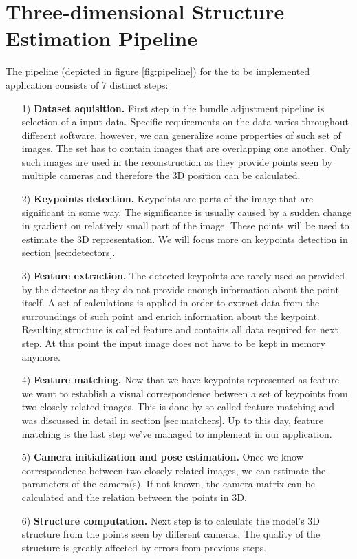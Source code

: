 \section{Three-dimensional Structure Estimation Pipeline}
The pipeline (depicted in figure \ref{fig:pipeline}) for the to be implemented application consists of 7 distinct steps:
\begin{itemize}
	\item[1)] \textbf{Dataset aquisition.} First step in the bundle adjustment pipeline is selection of a input data. Specific requirements on the data varies throughout different software, however, we can generalize some properties of such set of images. The set has to contain images that are overlapping one another. Only such images are used in the reconstruction as they provide points seen by multiple cameras and therefore the 3D position can be calculated.
	\item[2)] \textbf{Keypoints detection.} Keypoints are parts of the image that are significant in some way. The significance is usually caused by a sudden change in gradient on relatively small part of the image. These points will be used to estimate the 3D representation. We will focus more on keypoints detection in section \ref{sec:detectors}. 
	\item[3)] \textbf{Feature extraction.} The detected keypoints are rarely used as provided by the detector as they do not provide enough information about the point itself. A set of calculations is applied in order to extract data from the surroundings of such point and enrich information about the keypoint. Resulting structure is called feature and contains all data required for next step. At this point the input image does not have to be kept in memory anymore.
	\item[4)] \textbf{Feature matching.} Now that we have keypoints represented as feature we want to establish a visual correspondence between a set of keypoints from two closely related images. This is done by so called feature matching and was discussed in detail in section \ref{sec:matchers}. Up to this day, feature matching is the last step we've managed to implement in our application.
	\item[5)] \textbf{Camera initialization and pose estimation.} Once we know correspondence between two closely related images, we can estimate the parameters of the camera(s). If not known, the camera matrix can be calculated and the relation between the points in 3D.
	\item[6)] \textbf{Structure computation.} Next step is to calculate the model's 3D structure from the points seen by different cameras. The quality of the structure is greatly affected by errors from previous steps.

\end{itemize}
